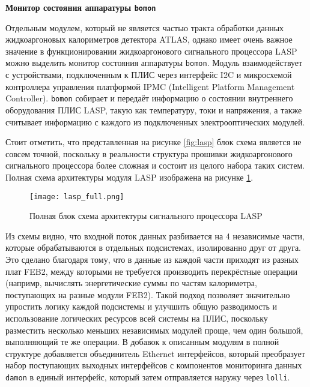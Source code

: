 \textbf{Монитор состояния аппаратуры \texttt{bomon}}\par
Отдельным модулем, который не является частью тракта обработки данных жидкоаргоновых калориметров детектора ATLAS, однако имеет очень важное значение в функционировании жидкоаргонового сигнального процессора LASP можно выделить монитор состояния аппаратуры \texttt{bomon}. Модуль взаимодействует с устройствами, подключенным к ПЛИС через интерфейс I2C и микросхемой контроллера управления платформой IPMC (Intelligent Platform Management Controller). \texttt{bomon} собирает и передаёт информацию о состоянии внутреннего оборудования ПЛИС LASP, такую как температуру, токи и напряжения, а также считывает информацию с каждого из подключенных электрооптических модулей.\par
Стоит отметить, что представленная на рисунке \ref{fig:lasp} блок схема является не совсем точной, поскольку в реальности структура прошивки жидкоаргонового сигнального процессора более сложная и состоит из целого набора таких систем. Полная схема архитектуры модуля LASP изображена на рисунке \ref{fig:lasp_full}.\par

\begin{figure}[ht]
    \centering
    \texttt{[image: lasp\_full.png]}
    \caption{Полная блок схема архитектуры сигнального процессора LASP}
    \label{fig:lasp_full}
\end{figure}\par

Из схемы видно, что входной поток данных разбивается на 4 независимые части, которые обрабатываются в отдельных подсистемах, изолированно друг от друга. Это сделано благодаря тому, что в данные из каждой части приходят из разных плат FEB2, между которыми не требуется производить перекрёстные операции (напримр, вычислять энергетические суммы по частям калориметра, поступающих на разные модули FEB2). Такой подход позволяет значительно упростить логику каждой подсистемы и улучшить общую разводимость и использование логических ресурсов всей системы на ПЛИС, поскольку разместить несколько меньших независимых модулей проще, чем один большой, выполняющий те же операции. В добавок к описанным модулям в полной структуре добавляется объединитель Ethernet интерфейсов, который преобразует набор поступающих выходных интерфейсов с компонентов мониторинга данных \texttt{damon} в единый интерфейс, который затем отправляется наружу через \texttt{lolli}.\par
